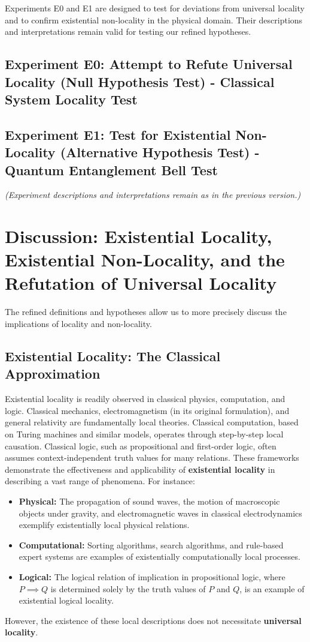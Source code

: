 Experiments E0 and E1 are designed to test for deviations from universal locality and to confirm existential non-locality in the physical domain. Their descriptions and interpretations remain valid for testing our refined hypotheses.

\subsection{Experiment E0: Attempt to Refute Universal Locality (Null Hypothesis Test) - Classical System Locality Test}
\subsection{Experiment E1: Test for Existential Non-Locality (Alternative Hypothesis Test) - Quantum Entanglement Bell Test}
\textit{(Experiment descriptions and interpretations remain as in the previous version.)}

\section{Discussion: Existential Locality, Existential Non-Locality, and the Refutation of Universal Locality}

The refined definitions and hypotheses allow us to more precisely discuss the implications of locality and non-locality.

\subsection{Existential Locality: The Classical Approximation}

Existential locality is readily observed in classical physics, computation, and logic.  Classical mechanics, electromagnetism (in its original formulation), and general relativity are fundamentally local theories.  Classical computation, based on Turing machines and similar models, operates through step-by-step local causation.  Classical logic, such as propositional and first-order logic, often assumes context-independent truth values for many relations. These frameworks demonstrate the effectiveness and applicability of \textbf{existential locality} in describing a vast range of phenomena.  For instance:

\begin{itemize}
	\item \textbf{Physical:}  The propagation of sound waves, the motion of macroscopic objects under gravity, and electromagnetic waves in classical electrodynamics exemplify existentially local physical relations.
	\item \textbf{Computational:}  Sorting algorithms, search algorithms, and rule-based expert systems are examples of existentially computationally local processes.
	\item \textbf{Logical:}  The logical relation of implication in propositional logic, where $P \implies Q$ is determined solely by the truth values of $P$ and $Q$, is an example of existential logical locality.
\end{itemize}
However, the existence of these local descriptions does not necessitate \textbf{universal locality}.

